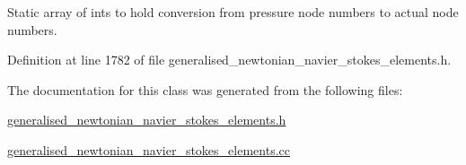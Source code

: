 Static array of ints to hold conversion from pressure node numbers to actual node numbers. 



Definition at line 1782 of file generalised\+\_\+newtonian\+\_\+navier\+\_\+stokes\+\_\+elements.\+h.



The documentation for this class was generated from the following files\+:\begin{DoxyCompactItemize}
\item 
\hyperlink{generalised__newtonian__navier__stokes__elements_8h}{generalised\+\_\+newtonian\+\_\+navier\+\_\+stokes\+\_\+elements.\+h}\item 
\hyperlink{generalised__newtonian__navier__stokes__elements_8cc}{generalised\+\_\+newtonian\+\_\+navier\+\_\+stokes\+\_\+elements.\+cc}\end{DoxyCompactItemize}
